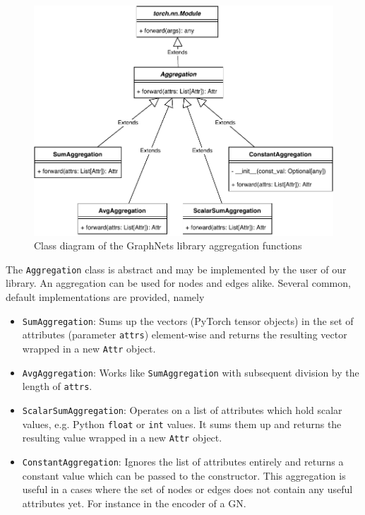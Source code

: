\begin{figure}\centering
    \includegraphics[scale=0.65]{resources/graphnets-functions-aggr}
    \caption{Class diagram of the GraphNets library aggregation functions}\label{fig:classdiagramgnfunctionsaggr}
\end{figure}

The \texttt{Aggregation} class is abstract and may be implemented by the user of our library. An aggregation can be used for nodes and edges alike. Several common, default implementations are provided, namely

\begin{itemize}
    \item \texttt{SumAggregation}: Sums up the vectors (PyTorch tensor objects) in the set of attributes (parameter \texttt{attrs}) element-wise and returns the resulting vector wrapped in a new \texttt{Attr} object.
    \item \texttt{AvgAggregation}: Works like \texttt{SumAggregation} with subsequent division by the length of \texttt{attrs}.
    \item \texttt{ScalarSumAggregation}: Operates on a list of attributes which hold scalar values, e.g. Python \texttt{float} or \texttt{int} values. It sums them up and returns the resulting value wrapped in a new \texttt{Attr} object.
    \item \texttt{ConstantAggregation}: Ignores the list of attributes entirely and returns a constant value which can be passed to the constructor. This aggregation is useful in a cases where the set of nodes or edges does not contain any useful attributes yet. For instance in the encoder of a GN.
\end{itemize}

